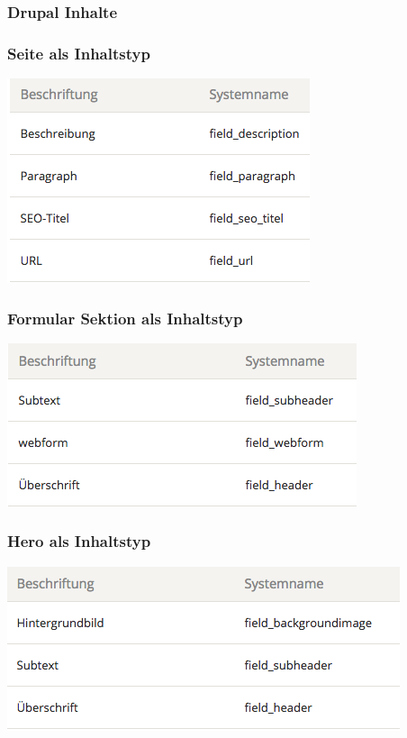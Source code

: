 \documentclass[11pt,a4paper]{article}
\begin{document}
\begin{appendices}
\subsubsection{Drupal Inhalte}
\label{sec:content}
\subsubsection*{Seite als Inhaltstyp}
\includegraphics[scale=0.5]{Page}
\subsubsection*{Formular Sektion als Inhaltstyp}
\includegraphics[scale=0.5]{Form}
\subsubsection*{Hero als Inhaltstyp}
\includegraphics[scale=0.5]{Hero}

\end{appendices}
\end{document}
